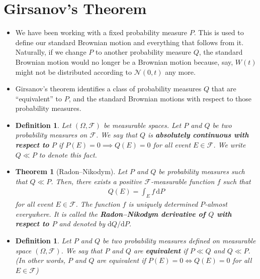 \documentclass[10pt]{article}
\newtheorem{theorem}[lemma]{Theorem}
\newtheorem{definition}[lemma]{Definition}
\newcommand{\dee}{\mathrm{d}}
\newcommand{\mcal}[1]{\mathcal{#1}}
\begin{document}
\section{Girsanov's Theorem}

\begin{itemize}
  \item We have been working with a fixed probability measure $P$. This is used to define our standard Brownian motion and everything that follows from it. Naturally, if we change $P$ to another probability measure $Q$, the standard Brownian motion would no longer be a Brownian motion because, say, $W(t)$ might not be distributed according to $\mcal{N}(0,t)$ any more.
  
  \item Girsanov's theorem identifies a class of probability measures $Q$ that are ``equivalent'' to $P$, and the standard Brownian motions with respect to those probability measures.
  
  \item \begin{definition}
    Let $(\Omega, \mcal{F})$ be measurable spaces. Let $P$ and $Q$ be two probability measures on $\mcal{F}$. We say that $Q$ is {\bf absolutely continuous with respect to} $P$ if $P(E) = 0 \implies Q(E) = 0$ for all event $E \in \mcal{F}$. We write $Q \ll P$ to denote this fact.
  \end{definition}

  \item \begin{theorem}[Radon--Nikodym]
    Let $P$ and $Q$ be probability measures such that $Q \ll P$. Then, there exists a positive $\mcal{F}$-measurable function $f$ such that
    \begin{align*}
      Q(E) = \int_E f\, \dee P
    \end{align*}
    for all event $E \in \mcal{F}$. The function $f$ is uniquely determined $P$-almost everywhere. It is called the {\bf Radon--Nikodym derivative of $Q$ with respect to $P$} and denoted by $\dee Q / \dee P$.
  \end{theorem}

  \item \begin{definition}
    Let $P$ and $Q$ be two probability measures defined on measurable space $(\Omega, \mcal{F})$. We say that $P$ and $Q$ are {\bf equivalent} if $P \ll Q$ and $Q \ll P$. (In other words, $P$ and $Q$ are equivalent if $P(E) = 0 \iff Q(E) = 0$ for all $E \in \mcal{F}$)
  \end{definition}


\end{itemize}
\end{document}
